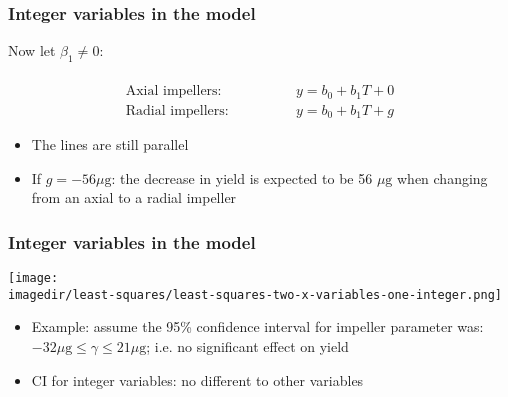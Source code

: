 \begin{frame}\frametitle{Integer variables in the model}

	Now let $\beta_1 \neq 0$:

	$$
	\begin{array}{ll}
		& \\
		\text{Axial impellers:} \qquad &\qquad y = b_0 + b_1 T + 0 \\
		\text{Radial impellers:} \qquad &\qquad y = b_0 + b_1 T + g
	\end{array}
	$$
	\begin{itemize}
		\item	The lines are still parallel
		\item	If $g = -56 \mu\text{g}$: the decrease in yield is expected to be 56 $\mu\text{g}$ when changing from an axial to a radial impeller
	\end{itemize}
\end{frame}

\begin{frame}\frametitle{Integer variables in the model}
	\begin{center}
		\texttt{[image: \\imagedir/least-squares/least-squares-two-x-variables-one-integer.png]}
	\end{center}
	\begin{itemize}
		\item	Example: assume the 95\% confidence interval for impeller parameter was: $ -32 \mu\text{g} \leq \gamma \leq 21 \mu\text{g}$; i.e. no significant effect on yield
		\item	CI for integer variables: no different to other variables
	\end{itemize}
\end{frame}


